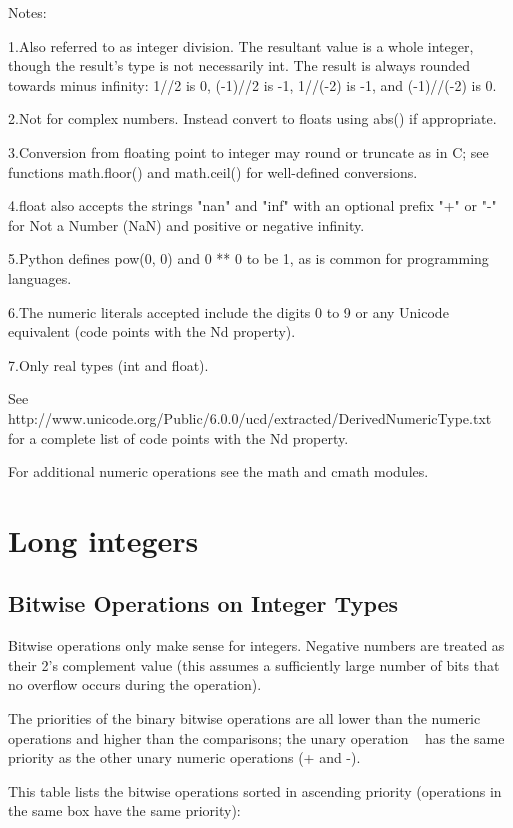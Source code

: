 Notes:

1.Also referred to as integer division. The resultant value is a whole integer, though the result's type is not necessarily int. The result is always rounded towards minus infinity: 1//2 is 0, (-1)//2 is -1, 1//(-2) is -1, and (-1)//(-2) is 0.

\vpara
2.Not for complex numbers. Instead convert to floats using abs() if appropriate.

\vpara
3.Conversion from floating point to integer may round or truncate as in C; see functions math.floor() and math.ceil() for well-defined conversions.

\vpara
4.float also accepts the strings "nan" and "inf" with an optional prefix "+" or "-" for Not a Number (NaN) and positive or negative infinity.

\vpara
5.Python defines pow(0, 0) and 0 ** 0 to be 1, as is common for programming languages.

\vpara
6.The numeric literals accepted include the digits 0 to 9 or any Unicode equivalent (code points with the Nd property).

7.Only real types (int and float).

See http://www.unicode.org/Public/6.0.0/ucd/extracted/DerivedNumericType.txt for a complete list of code points with the Nd property.


For additional numeric operations see the math and cmath modules.

\section{Long integers}

\subsection{Bitwise Operations on Integer Types}

Bitwise operations only make sense for integers. Negative numbers are treated as their 2’s complement value (this assumes a sufficiently large number of bits that no overflow occurs during the operation).

The priorities of the binary bitwise operations are all lower than the numeric operations and higher than the comparisons; the unary operation ~ has the same priority as the other unary numeric operations (+ and -).

This table lists the bitwise operations sorted in ascending priority (operations in the same box have the same priority):



